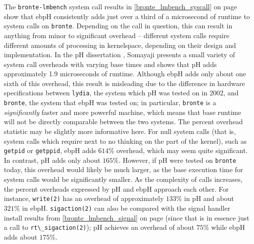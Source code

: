 \documentclass[
  12pt]{findlay}
\newcommand{\passthrough}[1]{#1}
\begin{document}
The \passthrough{\lstinline!bronte-lmbench!} system call results in
\autoref{bronte_lmbench_syscall} on page
\pageref{bronte_lmbench_syscall} show that ebpH consistently adds just
over a third of a microsecond of runtime to system calls on
\passthrough{\lstinline!bronte!}. Depending on the call in question,
this can result in anything from minor to significant overhead --
different system calls require different amounts of processing in
kernelspace, depending on their design and implementation. In the pH
dissertation \autocite{soma02}, Somayaji presents a small variety of
system call overheads with varying base times and shows that pH adds
approximately 1.9 microseconds of runtime. Although ebpH adds only about
one sixth of this overhead, this result is misleading due to the
difference in hardware specifications between
\passthrough{\lstinline!lydia!}, the system which pH was tested on in
2002, and \passthrough{\lstinline!bronte!}, the system that ebpH was
tested on; in particular, \passthrough{\lstinline!bronte!} is a
\emph{significantly} faster and more powerful machine, which means that
base runtime will not be directly comparable between the two systems.
The percent overhead statistic may be slightly more informative here.
For null system calls (that is, system calls which require next to no
thinking on the part of the kernel), such as
\passthrough{\lstinline!getpid!} or \passthrough{\lstinline!getppid!},
ebpH adds \(614\%\) overhead, which may seem quite significant. In
contrast, pH adds only about \(165\%\). However, if pH were tested on
\passthrough{\lstinline!bronte!} today, this overhead would likely be
much larger, as the base execution time for system calls would be
significantly smaller. As the complexity of calls increases, the percent
overheads expressed by pH and ebpH approach each other. For instance,
\passthrough{\lstinline!write(2)!} has an overhead of approximately
\(133\%\) in pH and about \(321\%\) in ebpH.
\passthrough{\lstinline!sigaction(2)!} can also be compared with the
signal handler install results from \autoref{bronte_lmbench_signal} on
page \pageref{bronte_lmbench_signal} (since that is in essence just a
call to \passthrough{\lstinline!rt\_sigaction(2)!}); pH achieves an
overhead of about \(75\%\) while ebpH adds about \(175\%\).
\end{document}
